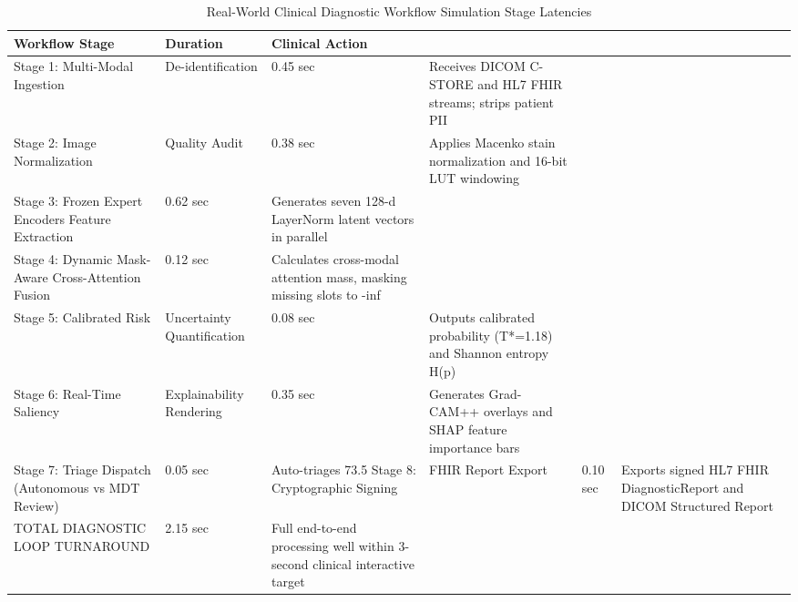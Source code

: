 \begin{table}
\caption{Real-World Clinical Diagnostic Workflow Simulation Stage Latencies}
\label{tab:table_6_01_09_clinical_diagnostic_workflow_and_turnaround_metrics}
\begin{tabular}{lll}
\toprule
Workflow Stage & Duration & Clinical Action \\
\midrule
Stage 1: Multi-Modal Ingestion & De-identification & 0.45 sec & Receives DICOM C-STORE and HL7 FHIR streams; strips patient PII \\
Stage 2: Image Normalization & Quality Audit & 0.38 sec & Applies Macenko stain normalization and 16-bit LUT windowing \\
Stage 3: Frozen Expert Encoders Feature Extraction & 0.62 sec & Generates seven 128-d LayerNorm latent vectors in parallel \\
Stage 4: Dynamic Mask-Aware Cross-Attention Fusion & 0.12 sec & Calculates cross-modal attention mass, masking missing slots to -inf \\
Stage 5: Calibrated Risk & Uncertainty Quantification & 0.08 sec & Outputs calibrated probability (T*=1.18) and Shannon entropy H(p) \\
Stage 6: Real-Time Saliency & Explainability Rendering & 0.35 sec & Generates Grad-CAM++ overlays and SHAP feature importance bars \\
Stage 7: Triage Dispatch (Autonomous vs MDT Review) & 0.05 sec & Auto-triages 73.5%
Stage 8: Cryptographic Signing & FHIR Report Export & 0.10 sec & Exports signed HL7 FHIR DiagnosticReport and DICOM Structured Report \\
TOTAL DIAGNOSTIC LOOP TURNAROUND & 2.15 sec & Full end-to-end processing well within 3-second clinical interactive target \\
\bottomrule
\end{tabular}
\end{table}
